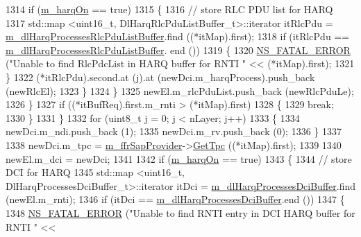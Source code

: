 \begin{DoxyCode}
1314                   \textcolor{keywordflow}{if} (\hyperlink{classns3_1_1TdTbfqFfMacScheduler_afbd88f1e039b365dcdbb076e99ce5506}{m\_harqOn} == \textcolor{keyword}{true})
1315                     \{
1316                       \textcolor{comment}{// store RLC PDU list for HARQ}
1317                       std::map <uint16\_t, DlHarqRlcPduListBuffer\_t>::iterator itRlcPdu =  
      \hyperlink{classns3_1_1TdTbfqFfMacScheduler_a997b6649f2a69dd389d9a4381707b755}{m\_dlHarqProcessesRlcPduListBuffer}.find ((*itMap).first);
1318                       \textcolor{keywordflow}{if} (itRlcPdu == \hyperlink{classns3_1_1TdTbfqFfMacScheduler_a997b6649f2a69dd389d9a4381707b755}{m\_dlHarqProcessesRlcPduListBuffer}.
      end ())
1319                         \{
1320                           \hyperlink{group__fatal_ga5131d5e3f75d7d4cbfd706ac456fdc85}{NS\_FATAL\_ERROR} (\textcolor{stringliteral}{"Unable to find RlcPdcList in HARQ buffer for RNTI 
      "} << (*itMap).first);
1321                         \}
1322                       (*itRlcPdu).second.at (j).at (newDci.m\_harqProcess).push\_back (newRlcEl);
1323                     \}
1324                 \}
1325               newEl.m\_rlcPduList.push\_back (newRlcPduLe);
1326             \}
1327           \textcolor{keywordflow}{if} ((*itBufReq).first.m\_rnti > (*itMap).first)
1328             \{
1329               \textcolor{keywordflow}{break};
1330             \}
1331         \}
1332       \textcolor{keywordflow}{for} (uint8\_t j = 0; j < nLayer; j++)
1333         \{
1334           newDci.m\_ndi.push\_back (1);
1335           newDci.m\_rv.push\_back (0);
1336         \}
1337 
1338       newDci.m\_tpc = \hyperlink{classns3_1_1TdTbfqFfMacScheduler_a9db8ce15b6803fe859e5c2908cd00e14}{m\_ffrSapProvider}->\hyperlink{classns3_1_1LteFfrSapProvider_a0021d72c12fdaddd3817ef0eb5a7cd4e}{GetTpc} ((*itMap).first);
1339 
1340       newEl.m\_dci = newDci;
1341 
1342       \textcolor{keywordflow}{if} (\hyperlink{classns3_1_1TdTbfqFfMacScheduler_afbd88f1e039b365dcdbb076e99ce5506}{m\_harqOn} == \textcolor{keyword}{true})
1343         \{
1344           \textcolor{comment}{// store DCI for HARQ}
1345           std::map <uint16\_t, DlHarqProcessesDciBuffer\_t>::iterator itDci = 
      \hyperlink{classns3_1_1TdTbfqFfMacScheduler_a50d8986111a3dc24130127d3ea391d7e}{m\_dlHarqProcessesDciBuffer}.find (newEl.m\_rnti);
1346           \textcolor{keywordflow}{if} (itDci == \hyperlink{classns3_1_1TdTbfqFfMacScheduler_a50d8986111a3dc24130127d3ea391d7e}{m\_dlHarqProcessesDciBuffer}.end ())
1347             \{
1348               \hyperlink{group__fatal_ga5131d5e3f75d7d4cbfd706ac456fdc85}{NS\_FATAL\_ERROR} (\textcolor{stringliteral}{"Unable to find RNTI entry in DCI HARQ buffer for RNTI "} << 

\end{DoxyCode}
